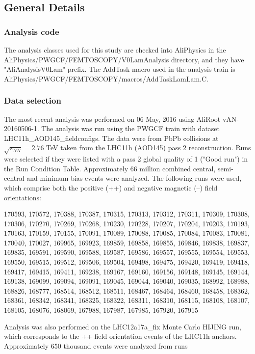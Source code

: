 \subsection{General Details}
\label{sec:GeneralDetails}

\subsubsection{Analysis code}
The analysis classes used for this study are checked into AliPhysics in the AliPhysics/PWGCF/FEMTOSCOPY/V0LamAnalysis directory, and they have "AliAnalysisV0Lam" prefix.
The AddTask macro used in the analysis train is AliPhysics/PWGCF/FEMTOSCOPY/macros/AddTaskLamLam.C.

\subsubsection{Data selection}
\label{sec:DataSelection}
The most recent analysis was performed on 06 May, 2016 using AliRoot vAN-20160506-1.
The analysis was run using the PWGCF train with dataset LHC11h\_AOD145\_fieldconfigs.
The data were from PbPb collisions at $\sqrt{s_{NN}}=2.76$  TeV taken from the LHC11h (AOD145) pass 2 reconstruction. 
Runs were selected if they were listed with a pass 2 global quality of 1 ("Good run") in the Run Condition Table. 
Approximately 66 million combined central, semi-central and minimum bias events were analyzed. 
The following runs were used, which comprise both the positive (++) and negative magnetic (--) field orientations:

170593, 170572, 170388, 170387, 170315, 170313, 170312, 170311, 170309, 170308, 170306, 170270, 170269, 170268, 170230, 170228, 170207, 170204, 170203, 170193, 170163, 170159, 170155, 170091, 170089, 170088, 170085, 170084, 170083, 170081, 170040, 170027, 169965, 169923, 169859, 169858, 169855, 169846, 169838, 169837, 169835, 169591, 169590, 169588, 169587, 169586, 169557, 169555, 169554, 169553, 169550, 169515, 169512, 169506, 169504, 169498, 169475, 169420, 169419, 169418, 169417, 169415, 169411, 169238, 169167, 169160, 169156, 169148, 169145, 169144, 169138, 169099, 169094, 169091, 169045, 169044, 169040, 169035, 168992, 168988, 168826, 168777, 168514, 168512, 168511, 168467, 168464, 168460, 168458, 168362, 168361, 168342, 168341, 168325, 168322, 168311, 168310, 168115, 168108, 168107, 168105, 168076, 168069, 167988, 167987, 167985, 167920, 167915

Analysis was also performed on the LHC12a17a\_fix Monte Carlo HIJING run, which corresponds to the ++ field orientation events of the LHC11h anchors.  
Approximately 650 thousand events were analyzed from runs

